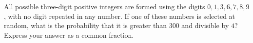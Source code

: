 All possible three-digit positive integers are formed using the digits $0,1,3,6,7,8,9$, with no digit repeated in any number. If one of these numbers is selected at random, what is the probability that it is greater than $300$ and divisible by $4$? Express your answer as a common fraction.
